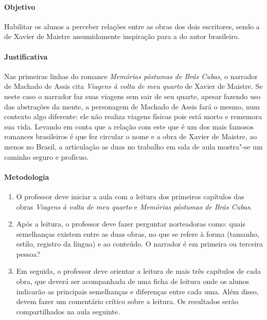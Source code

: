 \documentclass[12pt]{extarticle}
\begin{document}
\paragraph{Objetivo} Habilitar os alunos a perceber relações entre as obras dos 
dois escritores, sendo a de Xavier de Maistre assumidamente inspiração
para a do autor brasileiro.

\paragraph{Justificativa} Nas primeiras linhas do romance \emph{Memórias póstumas de Brás Cubas},
o narrador de Machado de Assis cita \emph{Viagens à volta de meu quarto} de Xavier de Maistre.
Se neste caso o narrador faz suas viagens sem sair de seu quarte, apesar fazendo uso das
abstrações da mente, a personagem de Machado de Assis fará o mesmo, num contexto
algo diferente: ele não realiza viagens físicas pois está morto e 
rememora sua vida. 
Levando em conta que a relação com este que é um dos mais famosos
romances brasileiros é que fez circular o nome e a obra de Xavier de Maistre, 
ao menos no Brasil, a articulação as duas no trabalho em sala de aula 
mostra"-se um caminho seguro e profícuo.

\paragraph{Metodologia}
\begin{enumerate}
	\item
	O professor deve iniciar a aula com a leitura dos primeiros capítulos das obras
	\emph{Viagens à volta de meu quarto} e \emph{Memórias póstumas de Brás Cubas}.

	\item
	Após a leitura, o professor deve fazer perguntar norteadoras como:
	quais semelhanças existem entre as duas obras, no que se refere à forma
	(tamanho, estilo, registro da língua) e ao conteúdo. O narrador
	é em primeira ou terceira pessoa?

	\item
	Em seguida, o professor deve orientar a leitura de mais três capítulos de cada
	obra, que deverá ser acompanhada de uma ficha de leitura onde os alunos 
	indicarão as principais semelhanças e diferenças entre cada uma. 
	Além disso, devem fazer um comentário crítico sobre a leitura.	
	Os resultados serão compartilhados na aula seguinte. 

\end{enumerate}
\end{document}
